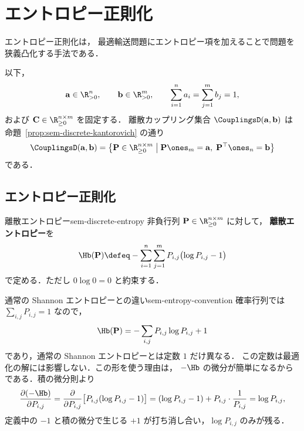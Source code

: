 \chapter{エントロピー正則化}
\label{ch:seminar-03-entropic}

エントロピー正則化は，
最適輸送問題にエントロピー項を加えることで問題を狭義凸化する手法である．

以下，
\[
  \mathbf{a} \in \R_{>0}^{n},\qquad
  \mathbf{b} \in \R_{>0}^{m},\qquad
  \sum_{i=1}^{n} a_i = \sum_{j=1}^{m} b_j = 1,
\]
および $\mathbf{C} \in \R_{\geq 0}^{n \times m}$ を固定する．
離散カップリング集合 $\CouplingsD(\mathbf{a}, \mathbf{b})$ は
命題~\ref{prop:sem-discrete-kantorovich} の通り
\[
  \CouplingsD(\mathbf{a}, \mathbf{b})
  =
  \left\{
    \mathbf{P} \in \R_{\geq 0}^{n \times m}
    \;\middle|\;
    \mathbf{P}\ones_m = \mathbf{a},\;
    \mathbf{P}^\top \ones_n = \mathbf{b}
  \right\}
\]
である．

\section{エントロピー正則化}
\label{sec:sem-entropic-regularization}

\begin{definition}{離散エントロピー}{sem-discrete-entropy}
  非負行列 $\mathbf{P} \in \R_{\geq 0}^{n \times m}$ に対して，
  \textbf{離散エントロピー}を
  \[
    \Hb(\mathbf{P})
    \defeq
    - \sum_{i=1}^{n} \sum_{j=1}^{m}
      P_{i,j}\bigl(\log P_{i,j} - 1\bigr)
  \]
  で定める．ただし $0\log 0 = 0$ と約束する．
\end{definition}

\begin{remark}{通常の Shannon エントロピーとの違い}{sem-entropy-convention}
  確率行列では $\sum_{i,j}P_{i,j}=1$ なので，
  \[
    \Hb(\mathbf{P})
    =
    -\sum_{i,j} P_{i,j}\log P_{i,j} + 1
  \]
  であり，通常の Shannon エントロピーとは定数 $1$ だけ異なる．
  この定数は最適化の解には影響しない．この形を使う理由は，
  $-\Hb$ の微分が簡単になるからである．積の微分則より
  \[
    \frac{\partial(-\Hb)}{\partial P_{i,j}}
    = \frac{\partial}{\partial P_{i,j}}\bigl[P_{i,j}(\log P_{i,j} - 1)\bigr]
    = (\log P_{i,j} - 1) + P_{i,j} \cdot \frac{1}{P_{i,j}}
    = \log P_{i,j},
  \]
  定義中の $-1$ と積の微分で生じる $+1$ が打ち消し合い，$\log P_{i,j}$ のみが残る．
\end{remark}

